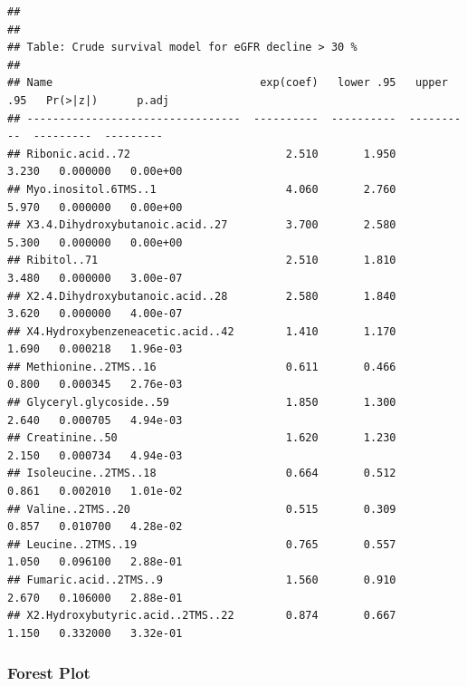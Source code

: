 \documentclass[]{article}
\begin{document}
\begin{verbatim}
## 
## 
## Table: Crude survival model for eGFR decline > 30 %
## 
## Name                                exp(coef)   lower .95   upper .95   Pr(>|z|)      p.adj
## ---------------------------------  ----------  ----------  ----------  ---------  ---------
## Ribonic.acid..72                        2.510       1.950       3.230   0.000000   0.00e+00
## Myo.inositol.6TMS..1                    4.060       2.760       5.970   0.000000   0.00e+00
## X3.4.Dihydroxybutanoic.acid..27         3.700       2.580       5.300   0.000000   0.00e+00
## Ribitol..71                             2.510       1.810       3.480   0.000000   3.00e-07
## X2.4.Dihydroxybutanoic.acid..28         2.580       1.840       3.620   0.000000   4.00e-07
## X4.Hydroxybenzeneacetic.acid..42        1.410       1.170       1.690   0.000218   1.96e-03
## Methionine..2TMS..16                    0.611       0.466       0.800   0.000345   2.76e-03
## Glyceryl.glycoside..59                  1.850       1.300       2.640   0.000705   4.94e-03
## Creatinine..50                          1.620       1.230       2.150   0.000734   4.94e-03
## Isoleucine..2TMS..18                    0.664       0.512       0.861   0.002010   1.01e-02
## Valine..2TMS..20                        0.515       0.309       0.857   0.010700   4.28e-02
## Leucine..2TMS..19                       0.765       0.557       1.050   0.096100   2.88e-01
## Fumaric.acid..2TMS..9                   1.560       0.910       2.670   0.106000   2.88e-01
## X2.Hydroxybutyric.acid..2TMS..22        0.874       0.667       1.150   0.332000   3.32e-01
\end{verbatim}

\newpage

\hypertarget{forest-plot-4}{%
\subsubsection{Forest Plot}\label{forest-plot-4}}
\end{document}
